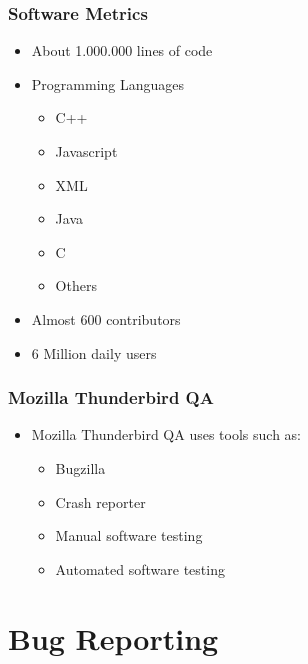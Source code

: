 \documentclass{beamer}
\begin{document}

\begin{frame}
\frametitle{Software Metrics}
 \begin{itemize}
 \item About 1.000.000 lines of code
 \item Programming Languages
    \begin{itemize}
     \item C++
     \item Javascript
     \item XML
     \item Java
     \item C
     \item Others
    \end{itemize}
 \item Almost 600 contributors
 \item 6 Million daily users
 \end{itemize}
\end{frame}


\begin{frame}
 \frametitle{Mozilla Thunderbird QA}
 \begin{itemize}
 \item Mozilla Thunderbird QA uses tools such as:
     \begin{itemize}
     \item Bugzilla
     \item Crash reporter
     \item Manual software testing
     \item Automated software testing 
     \end{itemize}
 \end{itemize}
\end{frame}


\section{Bug Reporting}

\end{document}
